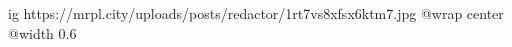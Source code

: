  
 
 
 
 

\ifcmt
  ig https://mrpl.city/uploads/posts/redactor/1rt7vs8xfsx6ktm7.jpg
  @wrap center
  @width 0.6
\fi
